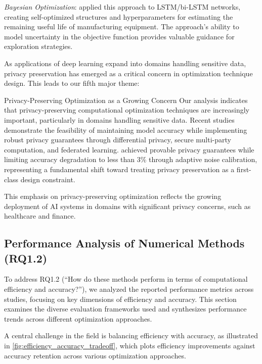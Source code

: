 \documentclass[acmsmall]{acmart}
\begin{document}
\textit{Bayesian Optimization}: \citet{Thoppil2021} applied this approach to LSTM/bi-LSTM networks, creating self-optimized structures and hyperparameters for estimating the remaining useful life of manufacturing equipment. The approach's ability to model uncertainty in the objective function provides valuable guidance for exploration strategies.

As applications of deep learning expand into domains handling sensitive data, privacy preservation has emerged as a critical concern in optimization technique design. This leads to our fifth major theme:

\begin{themebox}{Privacy-Preserving Optimization as a Growing Concern}
    Our analysis indicates that privacy-preserving computational optimization techniques are increasingly important, particularly in domains handling sensitive data. Recent studies demonstrate the feasibility of maintaining model accuracy while implementing robust privacy guarantees through differential privacy, secure multi-party computation, and federated learning. \citet{Zhang20229876} achieved provable privacy guarantees while limiting accuracy degradation to less than 3\% through adaptive noise calibration, representing a fundamental shift toward treating privacy preservation as a first-class design constraint.
\end{themebox}

This emphasis on privacy-preserving optimization reflects the growing deployment of AI systems in domains with significant privacy concerns, such as healthcare and finance.

\subsection{Performance Analysis of Numerical Methods (RQ1.2)}\label{subsec:performance-analysis-of-numerical-methods-rq12}
To address RQ1.2 (``How do these methods perform in terms of computational efficiency and accuracy?''), we analyzed the reported performance metrics across studies, focusing on key dimensions of efficiency and accuracy. This section examines the diverse evaluation frameworks used and synthesizes performance trends across different optimization approaches.

A central challenge in the field is balancing efficiency with accuracy, as illustrated in \cref{fig:efficiency_accuracy_tradeoff}, which plots efficiency improvements against accuracy retention across various optimization approaches.
\end{document}
